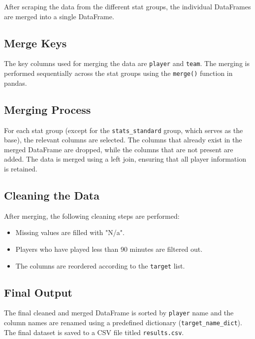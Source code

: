 \documentclass[a4paper,12pt]{article}
\begin{document}
After scraping the data from the different stat groups, the individual DataFrames are merged into a single DataFrame.

\subsection{Merge Keys}

The key columns used for merging the data are \texttt{player} and \texttt{team}. The merging is performed sequentially across the stat groups using the \texttt{merge()} function in pandas.

\subsection{Merging Process}

For each stat group (except for the \texttt{stats\_standard} group, which serves as the base), the relevant columns are selected. The columns that already exist in the merged DataFrame are dropped, while the columns that are not present are added. The data is merged using a left join, ensuring that all player information is retained.

\subsection{Cleaning the Data}

After merging, the following cleaning steps are performed:
\begin{itemize}
    \item Missing values are filled with "N/a".
    \item Players who have played less than 90 minutes are filtered out.
    \item The columns are reordered according to the \texttt{target} list.
\end{itemize}

\subsection{Final Output}

The final cleaned and merged DataFrame is sorted by \texttt{player} name and the column names are renamed using a predefined dictionary (\texttt{target\_name\_dict}). The final dataset is saved to a CSV file titled \texttt{results.csv}.
\end{document}
